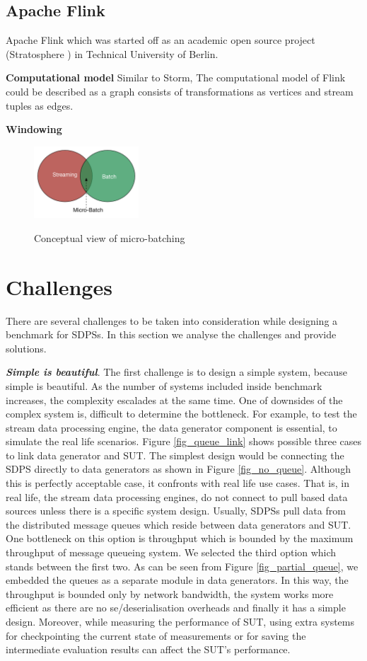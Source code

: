 \documentclass{vldb}
\begin{document}
\subsection{Apache Flink}
Apache Flink which was started off as an academic open source project (Stratosphere \cite{alexandrov2014stratosphere}) in Technical University of  Berlin.

\textbf{Computational model}
Similar to Storm, The computational model of Flink could be described as a graph consists of transformations as vertices and stream tuples as edges. 

\textbf{Windowing}


\begin{figure}[h]
\centering
\includegraphics[width=0.35\textwidth]{streambatch}
\label{fig_micro_batch}
\caption{Conceptual view of micro-batching}
\end{figure}


\section{Challenges}
There are several challenges to be taken into consideration while designing a benchmark for SDPSs. In this section we analyse the challenges and provide solutions.

\textbf{ \textit{Simple is beautiful}}. The first challenge is to design a simple system, because simple is beautiful. As the number of systems included inside benchmark increases, the complexity escalades at the same time. One of downsides of the complex system is, difficult to determine the bottleneck. For example, to test the stream data processing engine, the data generator component is essential, to simulate the real life scenarios. Figure \ref{fig_queue_link} shows possible three cases to link data generator and SUT. The simplest design would be connecting the SDPS directly to data generators as shown in Figure \ref{fig_no_queue}. Although this is perfectly acceptable case, it confronts with real life use cases. That is,  in real life, the stream data processing engines, do not connect to pull based data sources unless there is a specific system design. Usually, SDPSs pull data from the distributed message queues which reside between data generators and SUT. One bottleneck on this option is throughput which is bounded by the maximum throughput of message queueing system. We selected the third option which stands between the first two. As can be seen from Figure \ref{fig_partial_queue}, we embedded the queues as a separate module in data generators. In this way, the throughput is bounded only by network bandwidth, the system works more efficient as there are no se/deserialisation overheads and finally it has a simple design. Moreover, while measuring the performance of SUT, using extra systems for checkpointing the current state of measurements or for saving the intermediate evaluation results can affect the SUT's performance.
\end{document}
